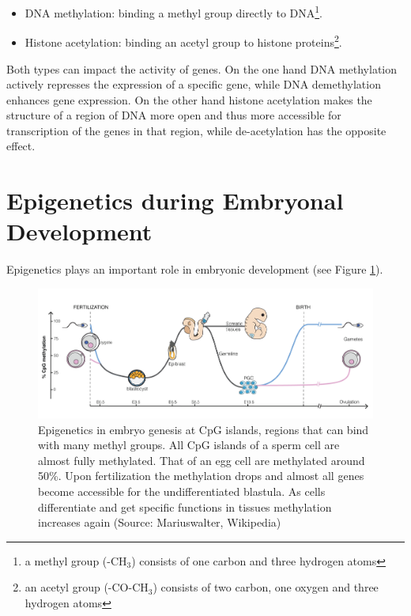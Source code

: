 \documentclass[
  11pt,
]{book}
\providecommand{\tightlist}{%
  \setlength{\itemsep}{0pt}\setlength{\parskip}{0pt}}
\begin{document}
\begin{itemize}
\tightlist
\item
  DNA methylation: binding a methyl group directly to DNA\footnote{a methyl group (-CH\(_3\)) consists of one carbon and three hydrogen atoms}.
\item
  Histone acetylation: binding an acetyl group to histone proteins\footnote{an acetyl group (-CO-CH\(_3\)) consists of two carbon, one oxygen and three hydrogen atoms}.
\end{itemize}

Both types can impact the activity of genes.
On the one hand DNA methylation actively represses the expression of a specific gene, while DNA demethylation enhances gene expression.
On the other hand histone acetylation makes the structure of a region of DNA more open and thus more accessible for transcription of the genes in that region, while de-acetylation has the opposite effect.

\hypertarget{epigenetics-during-embryonal-development}{%
\section{Epigenetics during Embryonal Development}\label{epigenetics-during-embryonal-development}}

Epigenetics plays an important role in embryonic development (see Figure \ref{fig:epiEmbryo}).



\begin{figure}

{\centering \includegraphics[width=1\linewidth]{./figs/DNA_methylation_reprogramming} 

}

\caption{Epigenetics in embryo genesis at CpG islands, regions that can bind with many methyl groups. All CpG islands of a sperm cell are almost fully methylated. That of an egg cell are methylated around 50\%. Upon fertilization the methylation drops and almost all genes become accessible for the undifferentiated blastula. As cells differentiate and get specific functions in tissues methylation increases again (Source: Mariuswalter, Wikipedia)}\label{fig:epiEmbryo}
\end{figure}
\end{document}
